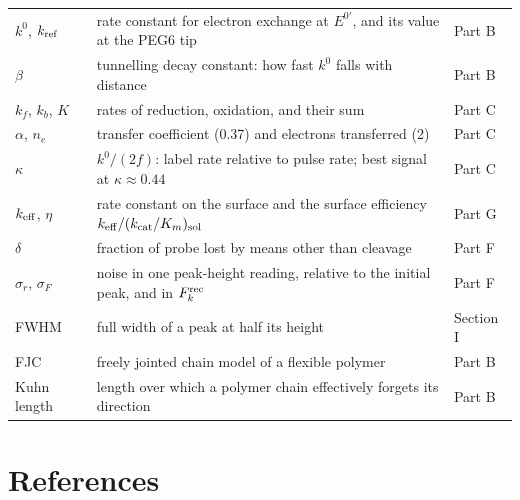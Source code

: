\documentclass[10pt,a4paper]{article}
\numberwithin{equation}{section}
\newcommand{\Fkrec}{F_k^{\rm rec}}
\newcommand{\kzero}{k^0}
\newcommand{\kref}{k_{\rm ref}}
\newcommand{\Eform}{E^{0\prime}}
\newcommand{\kappaMax}{0.44}
\begin{document}
\begin{center}
\begin{tabular}{@{}p{2.6cm}p{10.4cm}p{1.6cm}@{}}
$\kzero$, $\kref$ & rate constant for electron exchange at $\Eform$, and its value at the PEG6 tip & Part B \\
$\beta$ & tunnelling decay constant: how fast $\kzero$ falls with distance & Part B \\
$k_f$, $k_b$, $K$ & rates of reduction, oxidation, and their sum & Part C \\
$\alpha$, $n_e$ & transfer coefficient (0.37) and electrons transferred (2) & Part C \\
$\kappa$ & $\kzero/(2f)$: label rate relative to pulse rate; best signal at $\kappa\approx\kappaMax$ & Part C \\
$k_{\rm eff}$, $\eta$ & rate constant on the surface and the surface efficiency $k_{\rm eff}/(k_{\rm cat}/K_m)_{\rm sol}$ & Part G \\
$\delta$ & fraction of probe lost by means other than cleavage & Part F \\
$\sigma_r$, $\sigma_F$ & noise in one peak-height reading, relative to the initial peak, and in $\Fkrec$ & Part F \\
FWHM & full width of a peak at half its height & Section I \\
FJC & freely jointed chain model of a flexible polymer & Part B \\
Kuhn length & length over which a polymer chain effectively forgets its direction & Part B \\
\bottomrule
\end{tabular}
\end{center}

\section*{References}
\end{document}
